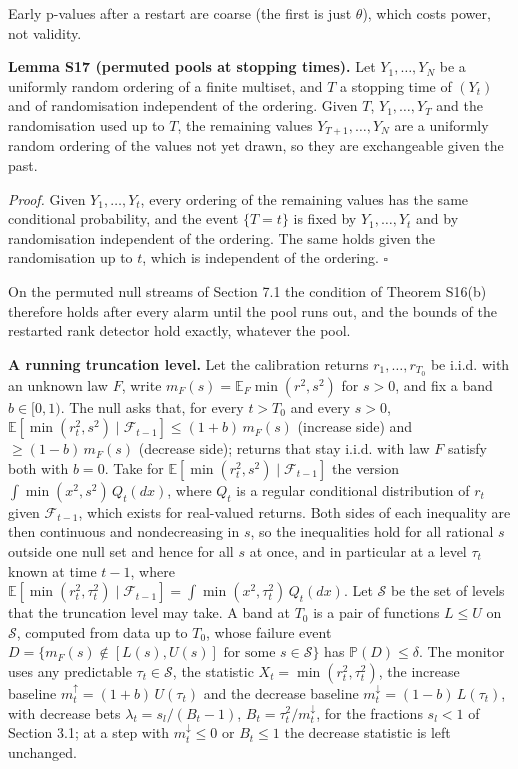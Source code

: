 \documentclass[
]{article}
\begin{document}
Early p-values after a restart are coarse (the first is just
\(\theta\)), which costs power, not validity.

\textbf{Lemma S17 (permuted pools at stopping times).} Let
\(Y_1, \dots, Y_N\) be a uniformly random ordering of a finite multiset,
and \(T\) a stopping time of \((Y_t)\) and of randomisation independent
of the ordering. Given \(T\), \(Y_1, \dots, Y_T\) and the randomisation
used up to \(T\), the remaining values \(Y_{T+1}, \dots, Y_N\) are a
uniformly random ordering of the values not yet drawn, so they are
exchangeable given the past.

\emph{Proof.} Given \(Y_1, \dots, Y_t\), every ordering of the remaining
values has the same conditional probability, and the event
\(\lbrace T = t\rbrace\) is fixed by \(Y_1, \dots, Y_t\) and by
randomisation independent of the ordering. The same holds given the
randomisation up to \(t\), which is independent of the ordering.
\(\square\)

On the permuted null streams of Section 7.1 the condition of Theorem
S16(b) therefore holds after every alarm until the pool runs out, and
the bounds of the restarted rank detector hold exactly, whatever the
pool.

\textbf{A running truncation level.} Let the calibration returns
\(r_1, \dots, r_{T_0}\) be i.i.d. with an unknown law \(F\), write
\(m_F(s) = \mathbb{E}_F\min(r^2, s^2)\) for \(s > 0\), and fix a band
\(b \in [0, 1)\). The null asks that, for every \(t > T_0\) and every
\(s > 0\),
\(\mathbb{E}[\min(r_t^2, s^2) \mid \mathcal{F}_{t-1}] \le (1 + b)\,m_F(s)\)
(increase side) and \(\ge (1 - b)\,m_F(s)\) (decrease side); returns
that stay i.i.d. with law \(F\) satisfy both with \(b = 0\). Take for
\(\mathbb{E}[\min(r_t^2, s^2) \mid \mathcal{F}_{t-1}]\) the version
\(\int \min(x^2, s^2)\,Q_t(dx)\), where \(Q_t\) is a regular conditional
distribution of \(r_t\) given \(\mathcal{F}_{t-1}\), which exists for
real-valued returns. Both sides of each inequality are then continuous
and nondecreasing in \(s\), so the inequalities hold for all rational
\(s\) outside one null set and hence for all \(s\) at once, and in
particular at a level \(\tau_t\) known at time \(t - 1\), where
\(\mathbb{E}[\min(r_t^2, \tau_t^2) \mid \mathcal{F}_{t-1}] = \int \min(x^2, \tau_t^2)\,Q_t(dx)\).
Let \(\mathcal{S}\) be the set of levels that the truncation level may
take. A band at \(T_0\) is a pair of functions \(L \le U\) on
\(\mathcal{S}\), computed from data up to \(T_0\), whose failure event
\(D = \lbrace m_F(s) \notin [L(s), U(s)] \text{ for some } s \in \mathcal{S}\rbrace\)
has \(\mathbb{P}(D) \le \delta\). The monitor uses any predictable
\(\tau_t \in \mathcal{S}\), the statistic
\(X_t = \min(r_t^2, \tau_t^2)\), the increase baseline
\(m_t^{\uparrow} = (1 + b)\,U(\tau_t)\) and the decrease baseline
\(m_t^{\downarrow} = (1 - b)\,L(\tau_t)\), with decrease bets
\(\lambda_t = s_l/(B_t - 1)\), \(B_t = \tau_t^2/m_t^{\downarrow}\), for
the fractions \(s_l < 1\) of Section 3.1; at a step with
\(m_t^{\downarrow} \le 0\) or \(B_t \le 1\) the decrease statistic is
left unchanged.
\end{document}
